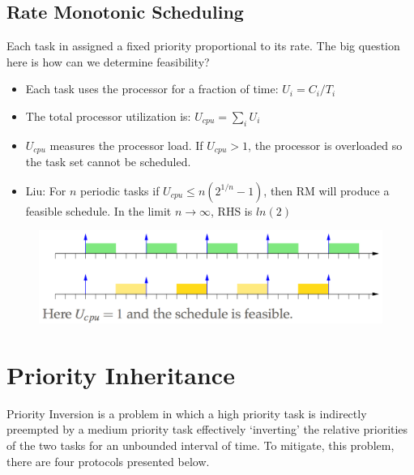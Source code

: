 \documentclass{hw}
\begin{document}
\subsection{Rate Monotonic Scheduling}
Each task in assigned a fixed priority proportional to its rate. The big question
here is how can we determine feasibility?
\begin{itemize}
  \item Each task uses the processor for a fraction of time: $U_{i} = C_{i}/T_{i}$
  \item The total processor utilization is: $U_{cpu} = \sum\limits_{i} U_{i}$
  \item $U_{cpu}$ measures the processor load. If $U_{cpu} > 1$, the processor
    is overloaded so the task set cannot be scheduled. 
  \item Liu: For $n$ periodic tasks if $U_{cpu} \leq n(2^{1/n}-1)$, then RM will
    produce a feasible schedule. In the limit $n \rightarrow \infty$, RHS is 
    $ln(2)$
\end{itemize}
\begin{figure}[H]
  \centering
  \includegraphics[scale=.6]{img/rm}
\end{figure}

\section{Priority Inheritance}
Priority Inversion is a problem in which a high priority task is indirectly 
preempted by a medium priority task effectively `inverting' the relative 
priorities of the two tasks for an unbounded interval of time. To mitigate, 
this problem, there are four protocols presented below.
\end{document}
